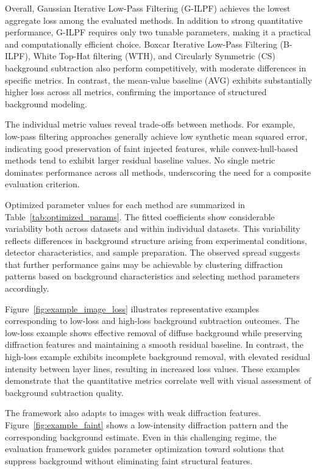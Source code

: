\documentclass[iucr,review]{iucrjournals}
\begin{document}
Overall, Gaussian Iterative Low-Pass Filtering (G-ILPF) achieves the lowest aggregate loss among the evaluated methods. In addition to strong quantitative performance, G-ILPF requires only two tunable parameters, making it a practical and computationally efficient choice. Boxcar Iterative Low-Pass Filtering (B-ILPF), White Top-Hat filtering (WTH), and Circularly Symmetric (CS) background subtraction also perform competitively, with moderate differences in specific metrics. In contrast, the mean-value baseline (AVG) exhibits substantially higher loss across all metrics, confirming the importance of structured background modeling.

The individual metric values reveal trade-offs between methods. For example, low-pass filtering approaches generally achieve low synthetic mean squared error, indicating good preservation of faint injected features, while convex-hull-based methods tend to exhibit larger residual baseline values. No single metric dominates performance across all methods, underscoring the need for a composite evaluation criterion.

Optimized parameter values for each method are summarized in Table~\ref{tab:optimized_params}. The fitted coefficients show considerable variability both across datasets and within individual datasets. This variability reflects differences in background structure arising from experimental conditions, detector characteristics, and sample preparation. The observed spread suggests that further performance gains may be achievable by clustering diffraction patterns based on background characteristics and selecting method parameters accordingly.

Figure~\ref{fig:example_image_loss} illustrates representative examples corresponding to low-loss and high-loss background subtraction outcomes. The low-loss example shows effective removal of diffuse background while preserving diffraction features and maintaining a smooth residual baseline. In contrast, the high-loss example exhibits incomplete background removal, with elevated residual intensity between layer lines, resulting in increased loss values. These examples demonstrate that the quantitative metrics correlate well with visual assessment of background subtraction quality.

The framework also adapts to images with weak diffraction features. Figure~\ref{fig:example_faint} shows a low-intensity diffraction pattern and the corresponding background estimate. Even in this challenging regime, the evaluation framework guides parameter optimization toward solutions that suppress background without eliminating faint structural features.
\end{document}
